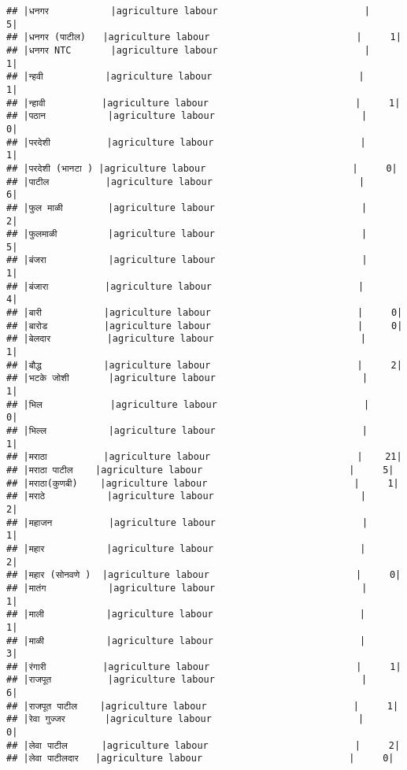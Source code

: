 \documentclass[
]{article}
\begin{document}
\begin{verbatim}
## |धनगर           |agriculture labour                          |     5|
## |धनगर (पाटील)   |agriculture labour                          |     1|
## |धनगर NTC       |agriculture labour                          |     1|
## |न्हवी           |agriculture labour                          |     1|
## |न्हावी          |agriculture labour                          |     1|
## |पठान           |agriculture labour                          |     0|
## |परदेशी          |agriculture labour                          |     1|
## |परदेशी (भानटा ) |agriculture labour                          |     0|
## |पाटील          |agriculture labour                          |     6|
## |फुल माळी        |agriculture labour                          |     2|
## |फुलमाळी         |agriculture labour                          |     5|
## |बंजरा           |agriculture labour                          |     1|
## |बंजारा          |agriculture labour                          |     4|
## |बारी           |agriculture labour                          |     0|
## |बारोड          |agriculture labour                          |     0|
## |बेलदार          |agriculture labour                          |     1|
## |बौद्ध           |agriculture labour                          |     2|
## |भटके जोशी       |agriculture labour                          |     1|
## |भिल            |agriculture labour                          |     0|
## |भिल्ल           |agriculture labour                          |     1|
## |मराठा          |agriculture labour                          |    21|
## |मराठा पाटील    |agriculture labour                          |     5|
## |मराठा(कुणबी)    |agriculture labour                          |     1|
## |मराठे           |agriculture labour                          |     2|
## |महाजन          |agriculture labour                          |     1|
## |महार           |agriculture labour                          |     2|
## |महार (सोनवणे )  |agriculture labour                          |     0|
## |मातंग           |agriculture labour                          |     1|
## |माली           |agriculture labour                          |     1|
## |माळी           |agriculture labour                          |     3|
## |रंगारी          |agriculture labour                          |     1|
## |राजपूत          |agriculture labour                          |     6|
## |राजपूत पाटील    |agriculture labour                          |     1|
## |रेवा गुज्जर       |agriculture labour                          |     0|
## |लेवा पाटील      |agriculture labour                          |     2|
## |लेवा पाटीलदार   |agriculture labour                          |     0|

\end{verbatim}
\end{document}
